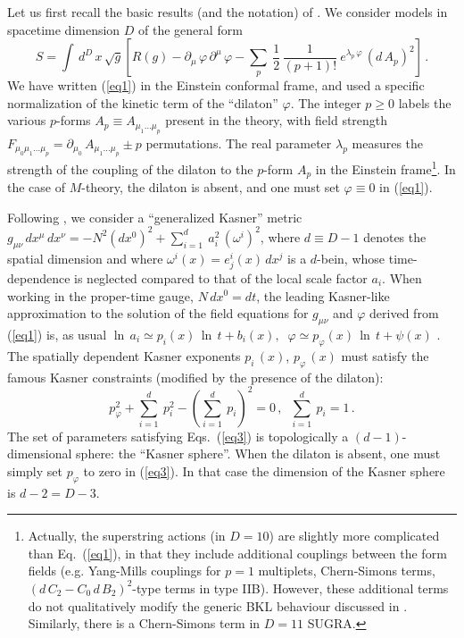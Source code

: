 \documentclass[a4paper,12pt]{article}
\begin{document}
Let us first recall the basic results (and the notation) of 
\cite{dh1}. We consider models in spacetime dimension $D$ of the 
general form
\begin{equation}
S = \int \, d^D \, x \, \sqrt{g} \left[ R(g) - \partial_{\mu} \, 
\varphi \, \partial^{\mu} \, \varphi - \sum_p \ \frac{1}{2} \, 
\frac{1}{(p+1)!} \ e^{\lambda_p \, \varphi} \, (d \, A_p)^2 \right] 
\, . \label{eq1}
\end{equation}
We have written (\ref{eq1}) in the Einstein conformal frame, and used a 
specific normalization of the kinetic term of the ``dilaton'' 
$\varphi$. The integer $p \geq 0$ labels the various $p$-forms $A_p 
\equiv A_{\mu_1 \ldots \mu_p}$ present in the theory, with field 
strength $F_{\mu_0 \mu_1 \ldots \mu_p} = \partial_{\mu_0} \, A_{\mu_1 
\ldots \mu_p} \pm p$ permutations. The real parameter $\lambda_p$ 
measures the strength of the coupling of the dilaton to the $p$-form 
$A_p$ in the Einstein frame\footnote{Actually, the superstring actions (in 
$D=10$) are slightly more complicated than Eq.~(\ref{eq1}), in that 
they include additional couplings between the form fields (e.g. 
Yang-Mills couplings for $p=1$ multiplets, Chern-Simons terms, $(d \, 
C_2 - C_0 \, d \, B_2)^2$-type terms in type IIB). However, these 
additional terms do not qualitatively modify the generic BKL 
behaviour discussed in \cite{dh1}. Similarly, there is a Chern-Simons
term in $D=11$ SUGRA.}. In the 
case of $M$-theory, the dilaton is 
absent, and one must set $\varphi \equiv 0$ in
(\ref{eq1}).

Following \cite{BKL}, we consider a ``generalized Kasner'' metric
$g_{\mu \nu} \, dx^{\mu} \, dx^{\nu} = -N^2 (dx^0)^2 + \sum_{i=1}^{d} 
\ a_i^2 \, (\omega^i)^2$, 
where $d \equiv D-1$ denotes the spatial dimension and where 
$\omega^i (x) = e_j^i (x) \, dx^j$ is a $d$-bein, whose 
time-dependence is neglected compared to that of the local scale 
factor $a_i$. When working in the proper-time gauge, $N \, dx^0 = 
dt$, the leading Kasner-like approximation to the solution of the 
field equations for $g_{\mu \nu}$ and $\varphi$ derived from 
(\ref{eq1}) is, as usual \cite{BKL}
$\ln \, a_i \simeq p_i (x) \, \ln \, t + b_i (x),  \; \;
\varphi \simeq p_{\varphi} (x) \, \ln \, t + \psi (x) $ . 
The spatially dependent Kasner exponents $p_i \, (x)$, 
$p_{\varphi} \, (x)$ must satisfy the famous Kasner constraints 
(modified by the presence of the dilaton):
\begin{equation}
p_{\varphi}^2 + \sum_{i=1}^d \ p_i^2 - \left(\sum_{i=1}^d \ p_i 
\right)^2 = 0 \, , \; \; 
\sum_{i=1}^d \ p_i = 1 \, . 
\label{eq3}
\end{equation}
The set of parameters satisfying Eqs.~(\ref{eq3}) is topologically
a $(d-1)$-dimensional sphere: the ``Kasner sphere''. When the 
dilaton is absent, one must simply set $p_\varphi$ to
zero in (\ref{eq3}).
In that case the dimension of the Kasner sphere is $d-2 = D-3$.
\end{document}
